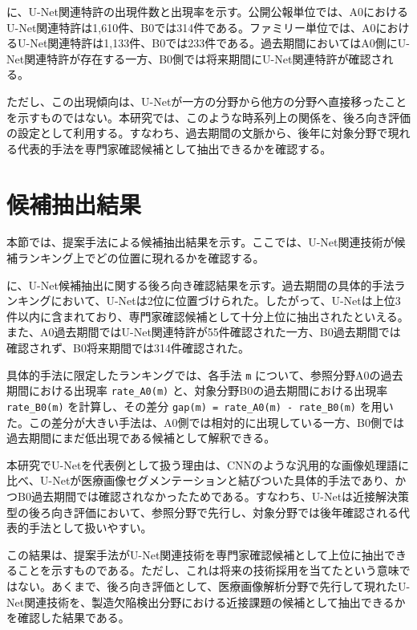 に、U-Net関連特許の出現件数と出現率を示す。公開公報単位では、A0におけるU-Net関連特許は1,610件、B0では314件である。ファミリー単位では、A0におけるU-Net関連特許は1,133件、B0では233件である。過去期間においてはA0側にU-Net関連特許が存在する一方、B0側では将来期間にU-Net関連特許が確認される。

ただし、この出現傾向は、U-Netが一方の分野から他方の分野へ直接移ったことを示すものではない。本研究では、このような時系列上の関係を、後ろ向き評価の設定として利用する。すなわち、過去期間の文脈から、後年に対象分野で現れる代表的手法を専門家確認候補として抽出できるかを確認する。

\section{候補抽出結果}




本節では、提案手法による候補抽出結果を示す。ここでは、U-Net関連技術が候補ランキング上でどの位置に現れるかを確認する。

に、U-Net候補抽出に関する後ろ向き確認結果を示す。過去期間の具体的手法ランキングにおいて、U-Netは2位に位置づけられた。したがって、U-Netは上位3件以内に含まれており、専門家確認候補として十分上位に抽出されたといえる。また、A0過去期間ではU-Net関連特許が55件確認された一方、B0過去期間では確認されず、B0将来期間では314件確認された。

具体的手法に限定したランキングでは、各手法 \texttt{m} について、参照分野A0の過去期間における出現率 \texttt{rate\_A0(m)} と、対象分野B0の過去期間における出現率 \texttt{rate\_B0(m)} を計算し、その差分 \texttt{gap(m) = rate\_A0(m) - rate\_B0(m)} を用いた。この差分が大きい手法は、A0側では相対的に出現している一方、B0側では過去期間にまだ低出現である候補として解釈できる。

本研究でU-Netを代表例として扱う理由は、CNNのような汎用的な画像処理語に比べ、U-Netが医療画像セグメンテーションと結びついた具体的手法であり、かつB0過去期間では確認されなかったためである。すなわち、U-Netは近接解決策型の後ろ向き評価において、参照分野で先行し、対象分野では後年確認される代表的手法として扱いやすい。

この結果は、提案手法がU-Net関連技術を専門家確認候補として上位に抽出できることを示すものである。ただし、これは将来の技術採用を当てたという意味ではない。あくまで、後ろ向き評価として、医療画像解析分野で先行して現れたU-Net関連技術を、製造欠陥検出分野における近接課題の候補として抽出できるかを確認した結果である。

